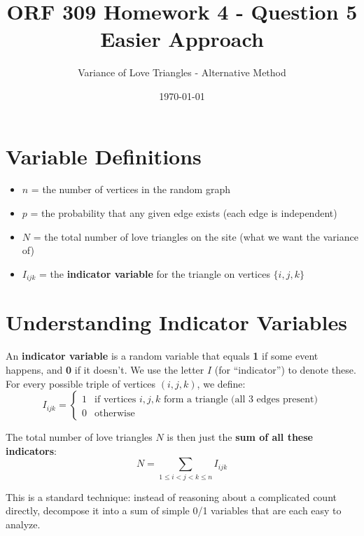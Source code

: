 \documentclass[11pt]{article}
\title{ORF 309 Homework 4 - Question 5\\Easier Approach}
\author{Variance of Love Triangles - Alternative Method}
\date{\today}
\begin{document}
\maketitle

\section*{Variable Definitions}

\begin{itemize}[leftmargin=2em]
    \item $n$ = the number of vertices in the random graph
    \item $p$ = the probability that any given edge exists (each edge is independent)
    \item $N$ = the total number of love triangles on the site (what we want the variance of)
    \item $I_{ijk}$ = the \textbf{indicator variable} for the triangle on vertices $\{i, j, k\}$
\end{itemize}

\section*{Understanding Indicator Variables}

An \textbf{indicator variable} is a random variable that equals \textbf{1} if some event happens, and \textbf{0} if it doesn't. We use the letter $I$ (for ``indicator'') to denote these. For every possible triple of vertices $(i, j, k)$, we define:
\[
I_{ijk} =
\begin{cases}
1 & \text{if vertices } i, j, k \text{ form a triangle (all 3 edges present)} \\
0 & \text{otherwise}
\end{cases}
\]

The total number of love triangles $N$ is then just the \textbf{sum of all these indicators}:
\[
N = \sum_{1 \leq i < j < k \leq n} I_{ijk}
\]

This is a standard technique: instead of reasoning about a complicated count directly, decompose it into a sum of simple 0/1 variables that are each easy to analyze.
\end{document}

